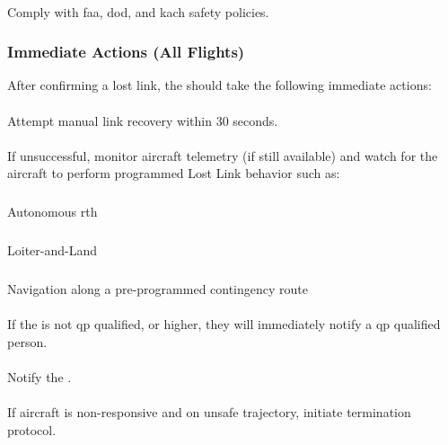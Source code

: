                 \paragraph{}Comply with \ac{faa}, \ac{dod}, and \ac{kach} safety policies.
                
            \subsubsection{Immediate Actions (All Flights)} After confirming a lost link, the  should take the following immediate actions:

               \paragraph{}Attempt manual link recovery within 30 seconds.

                \paragraph{}If unsuccessful, monitor aircraft telemetry (if still available) and watch for the aircraft to perform programmed Lost Link behavior such as:
                    
                    \subparagraph{}Autonomous \ac{rth}
                
                    \subparagraph{}Loiter-and-Land
                    
                    \subparagraph{} Navigation along a pre-programmed contingency route
                    
                \paragraph{} If the  is not \ac{qp} qualified, or higher, they will immediately notify a \ac{qp} qualified person. 

                \paragraph{} Notify the .

                \paragraph{} If aircraft is non-responsive and on unsafe trajectory, initiate termination protocol.

